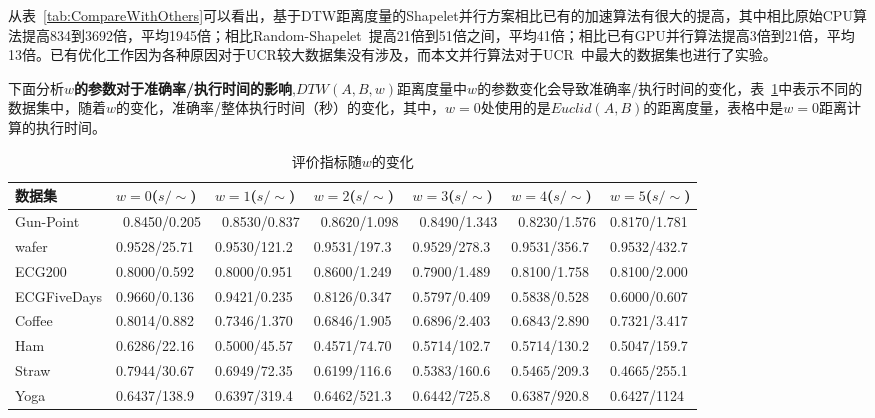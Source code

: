 从表~\ref{tab:CompareWithOthers}可以看出，基于DTW距离度量的Shapelet并行方案相比已有的加速算法有很大的提高，其中相比原始CPU算法提高834到3692倍，平均1945倍；相比Random-Shapelet~\cite{renard2015random}提高21倍到51倍之间，平均41倍；相比已有GPU并行算法提高3倍到21倍，平均13倍。已有优化工作因为各种原因对于UCR较大数据集没有涉及，而本文并行算法对于UCR~\cite{UCRArchive}中最大的数据集也进行了实验。

下面分析\textbf{$w$的参数对于准确率/执行时间的影响},$DTW(A,B,w)$距离度量中$w$的参数变化会导致准确率/执行时间的变化，表~\ref{tab:metricdpw}中表示不同的数据集中，随着$w$的变化，准确率/整体执行时间（秒）的变化，其中，$w=0$处使用的是$Euclid(A,B)$的距离度量，表格中是$w=0$距离计算的执行时间。
\begin{table}[htbp]
	\centering
	\begin{minipage}{\textwidth}
		\caption{评价指标随$w$的变化}
		\label{tab:metricdpw}
		\begin{tabular}{p{1.8cm}p{1.8cm}p{1.8cm}p{1.8cm}p{1.8cm}p{1.8cm}p{1.8cm}}
			\toprule[1.5pt]
			{\heiti 数据集} &{\heiti $w=0$($s/\sim$) } &{\heiti $w=1$($s/\sim$) } &{\heiti $w=2$($s/\sim$) } &{\heiti $w=3$($s/\sim$) } &{\heiti $w=4$($s/\sim$) } &{\heiti $w=5$($s/\sim$) }
			\\\midrule[1pt]
			Gun-Point    & 0.8450/0.205 & 0.8530/0.837 & 0.8620/1.098 & 0.8490/1.343 & 0.8230/1.576 & 0.8170/1.781 \\
			wafer & 0.9528/25.71 & 0.9530/121.2 & 0.9531/197.3 & 0.9529/278.3 & 0.9531/356.7 & 0.9532/432.7 \\
			ECG200 & 0.8000/0.592 & 0.8000/0.951 & 0.8600/1.249 & 0.7900/1.489 & 0.8100/1.758 & 0.8100/2.000 \\
			ECGFiveDays &  0.9660/0.136 & 0.9421/0.235 & 0.8126/0.347 & 0.5797/0.409 & 0.5838/0.528 & 0.6000/0.607 \\
			Coffee & 0.8014/0.882 & 0.7346/1.370 & 0.6846/1.905 &0.6896/2.403 & 0.6843/2.890 & 0.7321/3.417 \\
			Ham & 0.6286/22.16 & 0.5000/45.57 & 0.4571/74.70 & 0.5714/102.7 & 0.5714/130.2 & 0.5047/159.7 \\
			Straw & 0.7944/30.67 & 0.6949/72.35 & 0.6199/116.6 & 0.5383/160.6 & 0.5465/209.3 & 0.4665/255.1 \\
			Yoga & 0.6437/138.9 & 0.6397/319.4 & 0.6462/521.3 & 0.6442/725.8 & 0.6387/920.8 & 0.6427/1124 \\
			\bottomrule[1.5pt]
		\end{tabular}
	\end{minipage}
\end{table}

